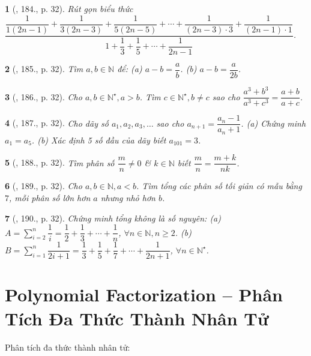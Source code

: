 \documentclass{article}
\newtheorem{baitoan}{}
\begin{document}
\begin{baitoan}[\cite{Binh_Toan_8_tap_1}, 184., p. 32]
	Rút gọn biểu thức $\dfrac{\dfrac{1}{1(2n - 1)} + \dfrac{1}{3(2n - 3)} + \dfrac{1}{5(2n - 5)} + \cdots + \dfrac{1}{(2n - 3)\cdot3} + \dfrac{1}{(2n - 1)\cdot1}}{1 + \dfrac{1}{3} + \dfrac{1}{5} + \cdots + \dfrac{1}{2n - 1}}$.
\end{baitoan}

\begin{baitoan}[\cite{Binh_Toan_8_tap_1}, 185., p. 32]
	Tìm $a,b\in\mathbb{N}$ để: (a) $a - b = \dfrac{a}{b}$. (b) $a - b = \dfrac{a}{2b}$.
\end{baitoan}

\begin{baitoan}[\cite{Binh_Toan_8_tap_1}, 186., p. 32]
	Cho $a,b\in\mathbb{N}^\star,a > b$. Tìm $c\in\mathbb{N}^\star,b\ne c$ sao cho $\dfrac{a^3 + b^3}{a^3 + c^3} = \dfrac{a + b}{a + c}$.
\end{baitoan}

\begin{baitoan}[\cite{Binh_Toan_8_tap_1}, 187., p. 32]
	Cho dãy số $a_1,a_2,a_3,\ldots$ sao cho $a_{n+1} = \dfrac{a_n - 1}{a_n + 1}$. (a) Chứng minh $a_1 = a_5$. (b) Xác định 5 số đầu của dãy biết $a_{101} = 3$.
\end{baitoan}

\begin{baitoan}[\cite{Binh_Toan_8_tap_1}, 188., p. 32]
	Tìm phân số $\dfrac{m}{n}\ne0$ \& $k\in\mathbb{N}$ biết $\dfrac{m}{n} = \dfrac{m + k}{nk}$.
\end{baitoan}

\begin{baitoan}[\cite{Binh_Toan_8_tap_1}, 189., p. 32]
	Cho $a,b\in\mathbb{N},a < b$. Tìm tổng các phân số tối giản có mẫu bằng $7$, mỗi phân số lớn hơn $a$ nhưng nhỏ hơn $b$.
\end{baitoan}

\begin{baitoan}[\cite{Binh_Toan_8_tap_1}, 190., p. 32]
	Chứng minh tổng không là số nguyên: (a) $A = \sum_{i=2}^n \dfrac{1}{i} = \dfrac{1}{2} + \dfrac{1}{3} + \cdots + \dfrac{1}{n}$, $\forall n\in\mathbb{N},n\ge2$. (b) $B = \sum_{i=1}^n \dfrac{1}{2i + 1} = \dfrac{1}{3} + \dfrac{1}{5} + \dfrac{1}{7} + \cdots + \dfrac{1}{2n + 1}$, $\forall n\in\mathbb{N}^\star$.
\end{baitoan}


\section{Polynomial Factorization -- Phân Tích Đa Thức Thành Nhân Tử}
Phân tích đa thức thành nhân tử:
\end{document}
